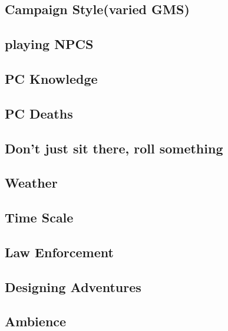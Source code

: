 	\subsection{Campaign Style(varied GMS)}
	\subsection{playing NPCS}
	\subsection{PC Knowledge}
	\subsection{PC Deaths}
	\subsection{Don't just sit there, roll something}
	\subsection{Weather}
	\subsection{Time Scale}
	\subsection{Law Enforcement}
	\subsection{Designing Adventures}
	\subsection{Ambience}



